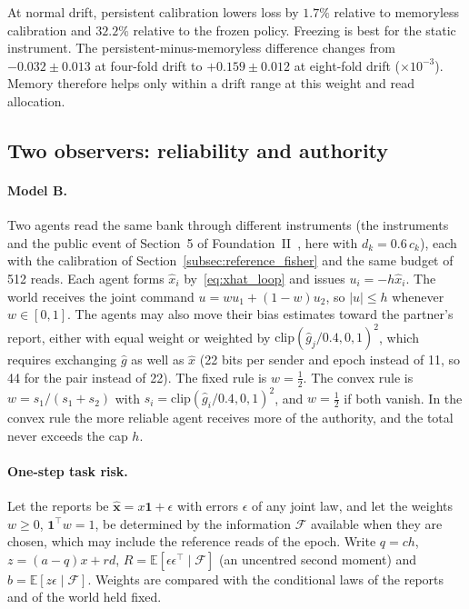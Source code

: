 \documentclass[12pt]{article}
\theoremstyle{definition}
\begin{document}
At normal drift, persistent calibration lowers loss by $1.7\%$ relative to memoryless calibration and $32.2\%$ relative to the frozen policy. Freezing is best for the static instrument. The persistent-minus-memoryless difference changes from $-0.032\pm0.013$ at four-fold drift to $+0.159\pm0.012$ at eight-fold drift ($\times10^{-3}$). Memory therefore helps only within a drift range at this weight and read allocation.

\subsection{Two observers: reliability and authority}\label{subsec:model_B}

\paragraph{Model B.} Two agents read the same bank through different instruments (the instruments and the public event of Section~5 of Foundation~II~\cite{Liu2026FII}, here with $d_k=0.6\,c_k$), each with the calibration of Section~\ref{subsec:reference_fisher} and the same budget of 512 reads. Each agent forms $\hat x_i$ by~\eqref{eq:xhat_loop} and issues $u_i=-h\hat x_i$. The world receives the joint command $u=wu_1+(1-w)u_2$, so $|u|\le h$ whenever $w\in[0,1]$. The agents may also move their bias estimates toward the partner's report, either with equal weight or weighted by $\mathrm{clip}(\hat g_j/0.4,0,1)^2$, which requires exchanging $\hat g$ as well as $\hat x$ (22 bits per sender and epoch instead of 11, so 44 for the pair instead of 22). The fixed rule is $w=\tfrac12$. The convex rule is $w=s_1/(s_1+s_2)$ with $s_i=\mathrm{clip}(\hat g_i/0.4,0,1)^2$, and $w=\tfrac12$ if both vanish. In the convex rule the more reliable agent receives more of the authority, and the total never exceeds the cap $h$.

\paragraph{One-step task risk.} Let the reports be $\hat{\boldsymbol x}=x\mathbf 1+\epsilon$ with errors $\epsilon$ of any joint law, and let the weights $w\ge0$, $\mathbf 1^{\!\top}w=1$, be determined by the information $\mathcal F$ available when they are chosen, which may include the reference reads of the epoch. Write $q=ch$, $z=(a-q)x+rd$, $R=\mathbb E[\epsilon\epsilon^\top\mid\mathcal F]$ (an uncentred second moment) and $b=\mathbb E[z\epsilon\mid\mathcal F]$. Weights are compared with the conditional laws of the reports and of the world held fixed.
\end{document}
